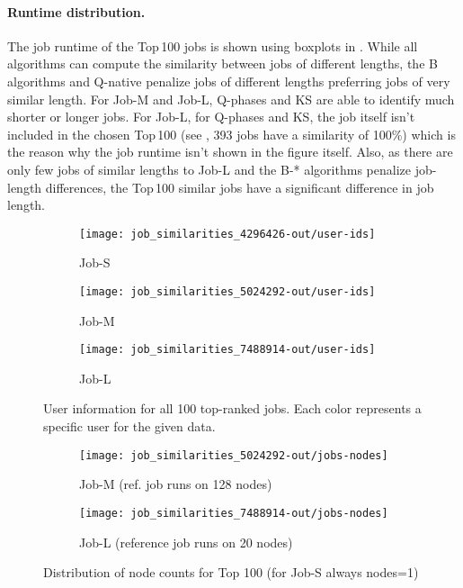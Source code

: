 \documentclass{jhps}
\begin{document}
\paragraph{Runtime distribution.}
The job runtime of the Top\,100 jobs is shown using boxplots in .
While all algorithms can compute the similarity between jobs of different lengths, the B algorithms and Q-native penalize jobs of different lengths preferring jobs of very similar length.
For Job-M and Job-L, Q-phases and KS are able to identify much shorter or longer jobs.
For Job-L, for Q-phases and KS, the job itself isn't included in the chosen Top\,100 (see , 393 jobs have a similarity of 100\%) which is the reason why the job runtime isn't shown in the figure itself.
Also, as there are only few jobs of similar lengths to Job-L and the B-* algorithms penalize job-length differences, the Top\,100 similar jobs have a significant difference in job length.

\begin{figure}[bt]
\begin{subfigure}{0.48\textwidth}
\centering
\texttt{[image: job\_similarities\_4296426-out/user-ids]}
\caption{Job-S}\label{fig:users-job-S}
\end{subfigure}
\begin{subfigure}{0.48\textwidth}
\centering
\texttt{[image: job\_similarities\_5024292-out/user-ids]}
\caption{Job-M}\label{fig:users-job-M}
\end{subfigure}
\begin{subfigure}{0.48\textwidth}
\centering
\texttt{[image: job\_similarities\_7488914-out/user-ids]}
\caption{Job-L}\label{fig:users-job-L}
\end{subfigure}

\caption{User information for all 100 top-ranked jobs. Each color represents a specific user for the given data.}
\label{fig:userids}
\end{figure}

\begin{figure}
\begin{subfigure}{0.48\textwidth}
\centering
\texttt{[image: job\_similarities\_5024292-out/jobs-nodes]}
\caption{Job-M (ref. job runs on 128 nodes)}\label{fig:nodes-job-M}
\end{subfigure}
\begin{subfigure}{0.48\textwidth}
\centering
\texttt{[image: job\_similarities\_7488914-out/jobs-nodes]}
\caption{Job-L (reference job runs on 20 nodes)}\label{fig:nodes-job-L}
\end{subfigure}
\centering
\caption{Distribution of node counts for Top 100 (for Job-S always nodes=1)}%
\label{fig:nodes-job}
\end{figure}
\end{document}
